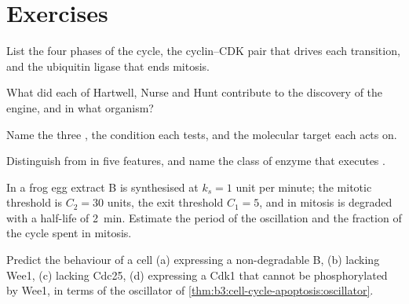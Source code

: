 \section{Exercises}

\begin{exercise}[$\star$]\label{exo:b3:cell-cycle-apoptosis:1}
List the four phases of the cycle, the cyclin--CDK pair that drives
each transition, and the ubiquitin ligase that ends mitosis.
\end{exercise}

\begin{exercise}[$\star$]\label{exo:b3:cell-cycle-apoptosis:2}
What did each of Hartwell, Nurse and Hunt contribute to the discovery
of the engine, and in what organism?
\end{exercise}

\begin{exercise}[$\star$]\label{exo:b3:cell-cycle-apoptosis:3}
Name the three , the condition each tests, and the
molecular target each acts on.
\end{exercise}

\begin{exercise}[$\star$]\label{exo:b3:cell-cycle-apoptosis:4}
Distinguish  from  in five features, and name the
class of enzyme that executes .
\end{exercise}

\begin{exercise}[$\star\star$]\label{exo:b3:cell-cycle-apoptosis:5}
In a frog egg extract  B is synthesised at $k_{s} = 1$ unit per
minute; the mitotic threshold is $C_{2} = 30$ units, the exit threshold
$C_{1} = 5$, and in mitosis  is degraded with a half-life of
\qty{2}{min}. Estimate the period of the oscillation and the fraction
of the cycle spent in mitosis.
\end{exercise}

\begin{exercise}[$\star\star$]\label{exo:b3:cell-cycle-apoptosis:6}
Predict the behaviour of a cell (a) expressing a non-degradable
 B, (b) lacking Wee1, (c) lacking Cdc25, (d) expressing a Cdk1
that cannot be phosphorylated by Wee1, in terms of the oscillator of
\cref{thm:b3:cell-cycle-apoptosis:oscillator}.
\end{exercise}

